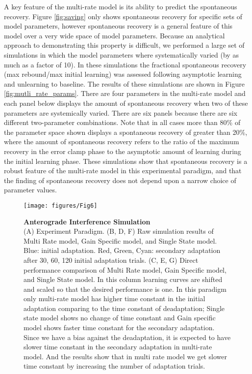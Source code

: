\documentclass[9pt,twocolumn]{paper-template}
\begin{document}
A key feature of the multi-rate model is its ability to predict the spontaneous recovery. Figure \ref{fig:saving} only shows spontaneous recovery for
specific sets of model parameters, however spontaneous recovery is a general feature of this
model over a very wide space of model parameters. Because an analytical approach to
demonstrating this property is difficult, we performed a large set of simulations in which the
model parameters where systematically varied (by as much as a factor of 10). In these simulations the fractional spontaneous
recovery (max rebound/max initial learning) was assessed following asymptotic learning and
unlearning to baseline. The results of these simulations are shown in Figure \ref{fig:mutli_rate_params}. There are four
parameters in the multi-rate model and each panel below displays the amount of
spontaneous recovery when two of these parameters are systemically varied. There are six
panels because there are six different two-parameter combinations. Note that in all cases
more than 80\% of the parameter space shown displays a spontaneous recovery of greater
than 20\%, where the amount of spontaneous recovery refers to the ratio of the maximum
recovery in the error clamp phase to the asymptotic amount of learning during the initial
learning phase. These simulations show that spontaneous recovery is a robust feature of
the multi-rate model in this experimental paradigm, and that the finding of spontaneous
recovery does not depend upon a narrow choice of parameter values.

\begin{figure}[h!]
  \centering
     \texttt{[image: figures/Fig6]}
  \caption{\textbf{Anterograde Interference Simulation}\\(A)  Experiment Paradigm. (B, D, F) Raw simulation results of Multi Rate model, Gain Specific model, and Single State model. Blue: initial adaptation. Red, Green, Cyan: secondary adaptation after 30, 60, 120 initial adaptation trials. (C, E, G) Direct performance comparison of Multi Rate model, Gain Specific model, and Single State model. In this column learning curves are shifted and scaled so that the desired performance is one. In this paradigm only multi-rate model has higher time constant in the initial adaptation comparing to the time constant of deadaptation; Single state model shows no change of time constant and Gain specific model shows faster time constant for the secondary adaptation. Since we have a bias against the deadaptation, it is expected to have slower time constant in the secondary adaptation in multi-rate model. And the results show that in multi rate model we get slower time constant by increasing the number of adaptation trials. 
}
  \label{fig:Anterograde_Interference_Simulation}
\end{figure}
\end{document}
